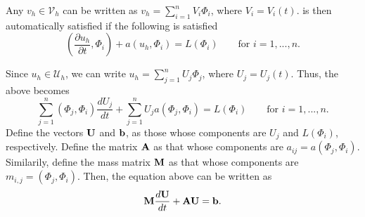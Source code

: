 \documentclass[oneside,a4paper,11pt]{report}
\begin{document}
Any $v_h \in \mathcal{V}_h$ can be written as $v_h = \sum_{i=1}^n V_i \Phi_i$, where $V_i = V_i(t)$.  is then automatically satisfied if the following is satisfied
\begin{equation}
    \label{eq:fe_cg_pde_basis_requirement}
    \left ( \frac{\partial u_h}{\partial t}, \Phi_i \right ) + a(u_h, \Phi_i) = L(\Phi_i) \qquad \text{for }i=1,...,n.
\end{equation}

Since $u_h \in \mathcal{U}_h$, we can write $u_h = \sum_{j=1}^n U_j \Phi_j$, where $U_j = U_j(t)$. Thus, the above becomes
\begin{equation}
    \sum_{j=1}^n (\Phi_j, \Phi_i) \frac{dU_j}{dt} + \sum_{j=1}^n U_j a(\Phi_j,\Phi_i) = L(\Phi_i) \qquad \text{for }i=1,...,n.
\end{equation}
Define the vectors $\mathbf{U}$ and $\mathbf{b}$, as those whose components are $U_j$ and $L(\Phi_i)$, respectively. Define the matrix $\mathbf{A}$ as that whose components are $a_{ij} = a(\Phi_j,\Phi_i)$. Similarily, define the mass matrix $\mathbf{M}$ as that whose components are $m_{i,j} = (\Phi_j, \Phi_i)$. Then, the equation above can be written as
\begin{equation}
    \mathbf{M} \frac{d \mathbf{U}}{dt} + \mathbf{A} \mathbf{U} = \mathbf{b}.
\end{equation}

\end{document}
